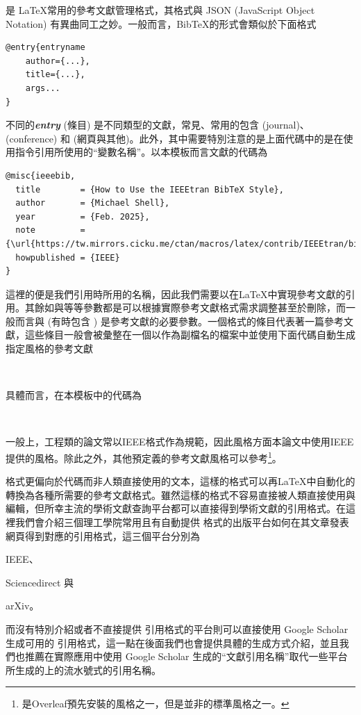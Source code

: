 \documentclass[12pt]{report}
\theoremstyle{plain}
\begin{document}
\BibTeX 是 \LaTeX 常用的參考文獻管理格式，其格式與 JSON (JavaScript Object Notation) 有異曲同工之妙。一般而言，BibTeX的形式會類似於下面格式
\begin{lstlisting}
@entry{entryname
    author={...},
    title={...},
    args...
}
\end{lstlisting}
不同的\textit{\textbf{entry}} (條目) 是不同類型的文獻，常見、常用的包含 (journal)、 (conference) 和  (網頁與其他)。此外，其中需要特別注意的是上面代碼中的是在使用指令引用所使用的``變數名稱''。以本模板而言文獻\cite{ieeebib}的\BibTeX{}代碼為
\begin{lstlisting}
@misc{ieeebib,
  title        = {How to Use the IEEEtran BibTeX Style},
  author       = {Michael Shell},
  year         = {Feb. 2025},
  note         = {\url{https://tw.mirrors.cicku.me/ctan/macros/latex/contrib/IEEEtran/bibtex/IEEEtran_bst_HOWTO.pdf}},
  howpublished = {IEEE}
}
\end{lstlisting}
這裡的便是我們引用時所用的名稱，因此我們需要以在\LaTeX 中實現參考文獻的引用。其餘如與等等參數都是可以根據實際參考文獻格式需求調整甚至於刪除，而一般而言與 (有時包含 ) 是參考文獻的必要參數。一個\BibTeX 格式的條目代表著一篇參考文獻，這些條目一般會被彙整在一個以作為副檔名的檔案中並使用下面代碼自動生成指定風格的參考文獻
\begin{lstlisting}


\end{lstlisting}
具體而言，在本模板中的代碼為
\begin{lstlisting}


\end{lstlisting}
一般上，工程類的論文常以IEEE格式作為規範，因此風格方面本論文中使用IEEE提供的風格。除此之外，其他預定義的參考文獻風格可以參考\cite{bibsty}\footnote{是Overleaf預先安裝的風格之一，但是並非\BibTeX 的標準風格之一。}。

\BibTeX 格式更偏向於代碼而非人類直接使用的文本，這樣的格式可以再\LaTeX 中自動化的轉換為各種所需要的參考文獻格式。雖然這樣的格式不容易直接被人類直接使用與編輯，但所幸主流的學術文獻查詢平台都可以直接得到學術文獻的\BibTeX 引用格式。在這裡我們會介紹三個理工學院常用且有自動提供 \BibTeX 格式的出版平台如何在其文章發表網頁得到對應的\BibTeX 引用格式，這三個平台分別為
\begin{enumerate*}
    \item IEEE、
    \item Sciencedirect 與
    \item arXiv。
\end{enumerate*}
而沒有特別介紹或者不直接提供 \BibTeX 引用格式的平台則可以直接使用 Google Scholar 生成可用的 \BibTeX 引用格式，這一點在後面我們也會提供具體的生成方式介紹，並且我們也推薦在實際應用中使用 Google Scholar 生成的``文獻引用名稱''取代一些平台所生成的\BibTeX 上的流水號式的引用名稱。
\end{document}
